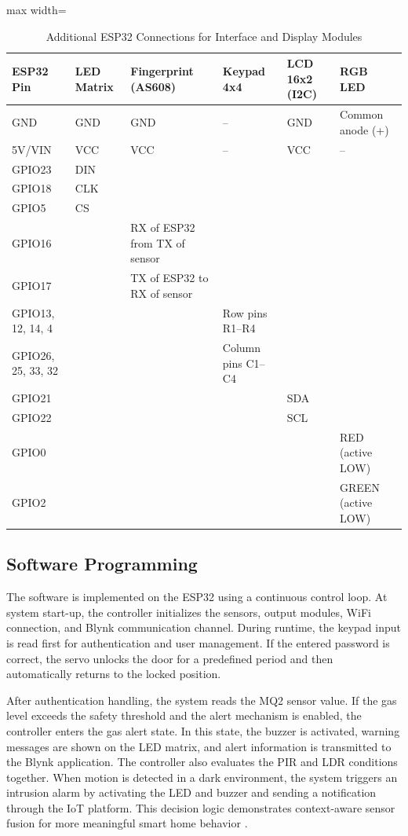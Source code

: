 \documentclass[conference]{IEEEtran}
\begin{document}
\begin{table}[!t]
\centering
\caption{Additional ESP32 Connections for Interface and Display Modules}
\label{tab:pinmap2}
\scriptsize
\setlength{\tabcolsep}{3pt}
\renewcommand{\arraystretch}{1.15}
\begin{adjustbox}{max width=\columnwidth}
\begin{tabular}{|l|l|l|l|l|l|}
\hline
\textbf{ESP32 Pin} & \textbf{LED Matrix} & \textbf{Fingerprint (AS608)} & \textbf{Keypad 4x4} & \textbf{LCD 16x2 (I2C)} & \textbf{RGB LED} \\
\hline
GND & GND & GND & -- & GND & Common anode (+) \\
\hline
5V/VIN & VCC & VCC & -- & VCC & -- \\
\hline
GPIO23 & DIN &  &  &  &  \\
\hline
GPIO18 & CLK &  &  &  &  \\
\hline
GPIO5 & CS &  &  &  &  \\
\hline
GPIO16 &  & RX of ESP32 from TX of sensor &  &  &  \\
\hline
GPIO17 &  & TX of ESP32 to RX of sensor &  &  &  \\
\hline
GPIO13, 12, 14, 4 &  &  & Row pins R1--R4 &  &  \\
\hline
GPIO26, 25, 33, 32 &  &  & Column pins C1--C4 &  &  \\
\hline
GPIO21 &  &  &  & SDA &  \\
\hline
GPIO22 &  &  &  & SCL &  \\
\hline
GPIO0 &  &  &  &  & RED (active LOW) \\
\hline
GPIO2 &  &  &  &  & GREEN (active LOW) \\
\hline
\end{tabular}
\end{adjustbox}
\end{table}

\subsection{Software Programming}
The software is implemented on the ESP32 using a continuous control loop. At system start-up, the controller initializes the sensors, output modules, WiFi connection, and Blynk communication channel. During runtime, the keypad input is read first for authentication and user management. If the entered password is correct, the servo unlocks the door for a predefined period and then automatically returns to the locked position.

After authentication handling, the system reads the MQ2 sensor value. If the gas level exceeds the safety threshold and the alert mechanism is enabled, the controller enters the gas alert state. In this state, the buzzer is activated, warning messages are shown on the LED matrix, and alert information is transmitted to the Blynk application. The controller also evaluates the PIR and LDR conditions together. When motion is detected in a dark environment, the system triggers an intrusion alarm by activating the LED and buzzer and sending a notification through the IoT platform. This decision logic demonstrates context-aware sensor fusion for more meaningful smart home behavior \cite{malche2017internet,iqbal2018interoperable}.
\end{document}
